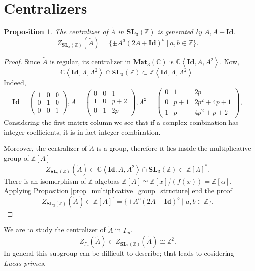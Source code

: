 \documentclass[a4paper]{article}
\newtheorem{Prop}[Thm]{Proposition}
\newcommand{\C}{\mathbb{C}}        %
\newcommand{\Id}{\mathbf{Id}}        %
\newcommand{\SL}{\mathbf{SL}_3(\mathbb{Z})}        %
\newcommand{\Mat}{\mathbf{Mat}_3(\mathbb{C})}        %
\newcommand{\SLp}{\Gamma_p}        %
\begin{document}
\section{Centralizers}
\begin{Prop}
	\label{proposition_centralizer_in_sl}
The centralizer of $\tilde A$ in $\SL$
is generated by $A, A+\Id$.
$$Z_{\SL}(\tilde A) = \{ \pm A^a (2 A + \Id)^b \mid a, b \in \mathbb{Z} \} .$$ 
\end{Prop}
\begin{proof}
Since $\tilde A$ is regular, its centralizer in $ \Mat $ is $\C \left< \Id, A, A^2 \right> $.
Now, 
\[
\C \left< \Id, A, A^2 \right> \cap \SL 
\subset \mathbb{Z} 
\left< \Id, A, A^2 \right>
.\] 
Indeed,
\begin{equation}
\Id = 
\begin{pmatrix}
1 & 0 & 0 \\
0 & 1 & 0 \\
0 & 0 & 1
\end{pmatrix}, 
A = 
\begin{pmatrix}
0 & 0 & 1 \\
1 & 0 & p+2 \\
0 & 1 & 2p
\end{pmatrix}, 
A^2 = 
\begin{pmatrix}
0 & 1 & 2p \\
0 & p+1 & 2p^2+4p+1 \\
1 & p & 4p^2+p+2
\end{pmatrix}, 
\end{equation}
Considering the first matrix column we see that if a complex combination has integer coefficients, it is in fact integer combination.

Moreover, 
the centralizer of $\tilde A$ is a group, therefore it lies inside the multiplicative group of $\mathbb{Z}[A]$
\[
Z_{\SL}(\tilde A)  \subset 
\C \left< \Id, A, A^2 \right> \cap \SL 
\subset \mathbb{Z}[A]^*
.\] 
There is an isomorphism of $\mathbb{Z}$-algebras $\mathbb{Z}[A] \simeq \mathbb{Z}[x]/(f(x)) = \mathbb{Z}[\alpha]$.
Applying Proposition \ref{prop_multiplicative_group_structure} end the proof
\[
Z_{\SL}(\tilde A) 
\subset \mathbb{Z}[A]^* =\{ \pm A^a (2 A + \Id)^b \mid a, b \in \mathbb{Z} \}.\] 
\end{proof}

We are to study the centralizer of $\tilde A$ in $\SLp$.
\[
Z_{\SLp}(\tilde A) \subset 
Z_{\SL}(\tilde A) \cong \mathbb{Z}^2
.\] 
In general this subgroup can be difficult to describe; 
that leads to cosidering \emph{Lucas primes}.
\end{document}

